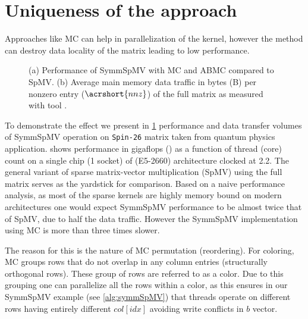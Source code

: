\section{Uniqueness of the approach} \label{sec:uniqueness}
Approaches like \acrshort{MC} can help in parallelization of the kernel, however
the method can destroy data locality of the matrix leading to low performance.
\setlength{\belowcaptionskip}{-12pt}
\begin{figure}[tb]
	 \hspace{1em}
	\caption{\label{fig:motivation}(a) Performance of \acrshort{SymmSpMV} with 
		\acrshort{MC} and \acrshort{ABMC} compared to \acrshort{SpMV}. 
		(b) Average main memory data traffic in bytes (B) per nonzero entry ($\acrshort{nnz}$) 
		of the full matrix as measured with \LIKWID tool \cite{LIKWID}.}
\end{figure}
To demonstrate the effect we present in \cref{fig:motivation} performance and 
data transfer volumes of  \acrshort{SymmSpMV} operation on \texttt{Spin-26} matrix 
taken from quantum physics application. 
shows performance in gigaflops (\GF) as a function of thread (core) count 
on a single chip (1 socket) of \Intel \IVB (E5-2660) architecture 
clocked at 2.2\GHZ.
The general variant  of sparse matrix-vector multiplication (\acrshort{SpMV})
 using the full matrix  serves as the yardstick for comparison. 
Based on a naive performance analysis, as most of the sparse
kernels are highly memory bound on modern architectures
one would expect \acrshort{SymmSpMV} performance 
to be almost twice that of \acrshort{SpMV}, due to half the data traffic. 
However the \acrshort{SymmSpMV} implementation using \acrshort{MC} is more
than three times slower.

 The reason for this is the nature of \acrlong{MC} 
permutation (reordering). For \DTWO coloring, \acrshort{MC}
groups rows that do not overlap in any column entries \cite{dist_k_def} 
(structurally orthogonal rows). These group of rows are referred to as
a color. Due to this grouping one can parallelize all the rows within a color, 
as this ensures in our \acrshort{SymmSpMV} example (see \cref{alg:symmSpMV})
that threads operate on different rows having entirely different 
$col[idx]$ avoiding write conflicts in $b$ vector.

